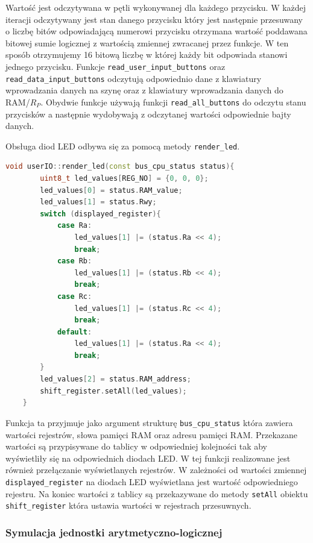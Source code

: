\documentclass[../main.tex]{subfiles}
\begin{document}
Wartość jest odczytywana w pętli wykonywanej dla każdego przycisku. W każdej iteracji odczytywany jest stan danego przycisku który
jest następnie przesuwany o liczbę bitów odpowiadającą numerowi przycisku otrzymana wartość poddawana bitowej sumie logicznej z wartością zmiennej
zwracanej przez funkcje. W ten sposób otrzymujemy 16 bitową liczbę w której każdy bit odpowiada stanowi jednego przycisku.
Funkcje \texttt{read\_user\_input\_buttons} oraz \texttt{read\_data\_input\_buttons} odczytują odpowiednio dane
z klawiatury wprowadzania danych na szynę oraz z klawiatury wprowadzania danych do RAM/$R_P$. Obydwie funkcje używają funkcji \texttt{read\_all\_buttons}
do odczytu stanu przycisków a następnie wydobywają z odczytanej wartości odpowiednie bajty danych.
\par
Obsługa diod LED odbywa się za pomocą metody \texttt{render\_led}. 

\begin{lstlisting}[language=C++]
    void userIO::render_led(const bus_cpu_status status){
        uint8_t led_values[REG_NO] = {0, 0, 0};
        led_values[0] = status.RAM_value;
        led_values[1] = status.Rwy;
        switch (displayed_register){
            case Ra:
                led_values[1] |= (status.Ra << 4);
                break;
            case Rb:
                led_values[1] |= (status.Rb << 4);
                break;
            case Rc:
                led_values[1] |= (status.Rc << 4);
                break;
            default:
                led_values[1] |= (status.Ra << 4);
                break;
        }
        led_values[2] = status.RAM_address;
        shift_register.setAll(led_values);
    }
\end{lstlisting}

Funkcja ta przyjmuje jako argument strukturę \texttt{bus\_cpu\_status} która zawiera wartości rejestrów, słowa pamięci RAM oraz adresu pamięci RAM.
Przekazane wartości są przypisywane do tablicy w odpowiedniej kolejności tak aby wyświetliły się na odpowiednich diodach LED. W tej funkcji
realizowane jest również przełączanie wyświetlanych rejestrów. W zależności od wartości zmiennej \texttt{displayed\_register} na diodach LED
wyświetlana jest wartość odpowiedniego rejestru. Na koniec wartości z tablicy są przekazywane do metody \texttt{setAll} obiektu \texttt{shift\_register}
która ustawia wartości w rejestrach przesuwnych.

\subsubsection{Symulacja jednostki arytmetyczno-logicznej}
\end{document}
